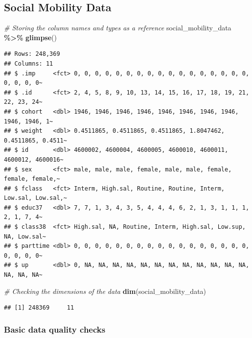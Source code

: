 \documentclass[
]{article}
\newenvironment{Shaded}{\begin{snugshade}}{\end{snugshade}}
\newcommand{\CommentTok}[1]{\textcolor[rgb]{0.56,0.35,0.01}{\textit{#1}}}
\newcommand{\FunctionTok}[1]{\textcolor[rgb]{0.13,0.29,0.53}{\textbf{#1}}}
\newcommand{\NormalTok}[1]{#1}
\newcommand{\SpecialCharTok}[1]{\textcolor[rgb]{0.81,0.36,0.00}{\textbf{#1}}}
\begin{document}
\subsection{Social Mobility Data}\label{social-mobility-data}

\begin{Shaded}
\begin{Highlighting}[]
\CommentTok{\# Storing the column names and types as a reference}
\NormalTok{social\_mobility\_data }\SpecialCharTok{\%\textgreater{}\%} \FunctionTok{glimpse}\NormalTok{()}
\end{Highlighting}
\end{Shaded}

\begin{verbatim}
## Rows: 248,369
## Columns: 11
## $ .imp     <fct> 0, 0, 0, 0, 0, 0, 0, 0, 0, 0, 0, 0, 0, 0, 0, 0, 0, 0, 0, 0, 0~
## $ .id      <fct> 2, 4, 5, 8, 9, 10, 13, 14, 15, 16, 17, 18, 19, 21, 22, 23, 24~
## $ cohort   <dbl> 1946, 1946, 1946, 1946, 1946, 1946, 1946, 1946, 1946, 1946, 1~
## $ weight   <dbl> 0.4511865, 0.4511865, 0.4511865, 1.8047462, 0.4511865, 0.4511~
## $ id       <dbl> 4600002, 4600004, 4600005, 4600010, 4600011, 4600012, 4600016~
## $ sex      <fct> male, male, male, female, male, male, female, female, female,~
## $ fclass   <fct> Interm, High.sal, Routine, Routine, Interm, Low.sal, Low.sal,~
## $ educ37   <dbl> 7, 7, 1, 3, 4, 3, 5, 4, 4, 4, 6, 2, 1, 3, 1, 1, 1, 2, 1, 7, 4~
## $ class38  <fct> High.sal, NA, Routine, Interm, High.sal, Low.sup, NA, Low.sal~
## $ parttime <dbl> 0, 0, 0, 0, 0, 0, 0, 0, 0, 0, 0, 0, 0, 0, 0, 0, 0, 0, 0, 0, 0~
## $ up       <dbl> 0, NA, NA, NA, NA, NA, NA, NA, NA, NA, NA, NA, NA, NA, NA, NA~
\end{verbatim}

\begin{Shaded}
\begin{Highlighting}[]
\CommentTok{\# Checking the dimensions of the data}
\FunctionTok{dim}\NormalTok{(social\_mobility\_data)}
\end{Highlighting}
\end{Shaded}

\begin{verbatim}
## [1] 248369     11
\end{verbatim}

\subsubsection{Basic data quality
checks}\label{basic-data-quality-checks}
\end{document}
